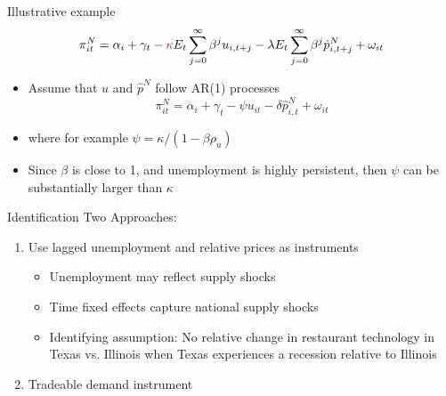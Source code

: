 \documentclass[english,xcolor=svgnames]{beamer}
\begin{document}
\begin{frame}{Illustrative example}
	\[\pi_{it}^N = \alpha_i + \gamma _t - \textcolor{purple}{{\kappa}} E_t \sum_{j=0}^{\infty} \beta^j u_{i,t+j} - \lambda E_t \sum_{j=0}^{\infty} \beta^j \hat{p}^N_{i,t+j} + \omega_{it} \] \vspace{-10pt}
\begin{itemize}
\item Assume that $u$ and $\hat{p}^N$ follow AR(1) processes
	\[\pi_{it}^N = \alpha_i + \gamma _t - \psi u_{it} - \delta  \hat{p}^N_{i,t} + \omega_{it} \] \vspace{-10pt}
\item where for example $\psi = \kappa/(1-\beta \rho_u)$
\item Since $\beta$ is close to 1, and unemployment is highly persistent, then $\psi$ can be substantially larger than  $\kappa$
\end{itemize}
\end{frame}



\begin{frame}{Identification} \label{identification}
Two Approaches: \vspace{10pt}
	\begin{enumerate}
		\itemsep1em 
		\item Use lagged unemployment and relative prices as instruments
		\begin{itemize}
			\item Unemployment may reflect supply shocks
			\item Time fixed effects capture national supply shocks
			\item Identifying assumption: No relative change in restaurant technology in Texas vs. Illinois when Texas experiences a recession relative to Illinois
		\end{itemize}
		\item Tradeable demand instrument
	\end{enumerate}
\end{frame}
\end{document}

